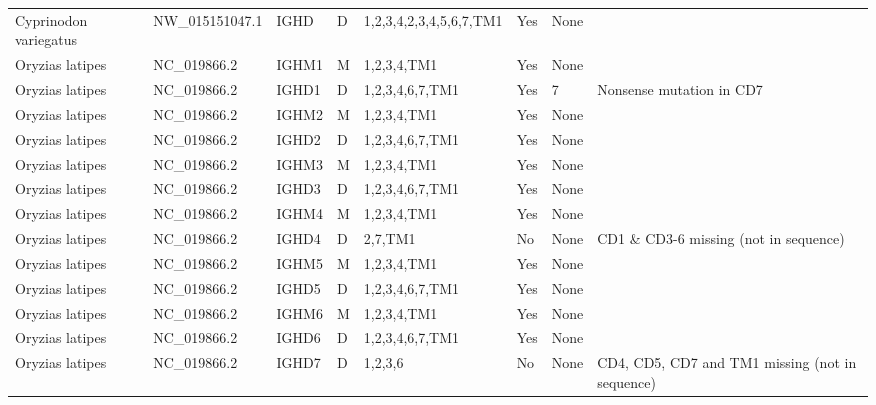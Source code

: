 \begin{tabular}{llllllll}
  Cyprinodon variegatus & NW\_015151047.1 & IGHD & D & 1,2,3,4,2,3,4,5,6,7,TM1 & Yes & None &  \\ 
  Oryzias latipes & NC\_019866.2 & IGHM1 & M & 1,2,3,4,TM1 & Yes & None &  \\ 
  Oryzias latipes & NC\_019866.2 & IGHD1 & D & 1,2,3,4,6,7,TM1 & Yes & 7 & Nonsense mutation in CD7 \\ 
  Oryzias latipes & NC\_019866.2 & IGHM2 & M & 1,2,3,4,TM1 & Yes & None &  \\ 
  Oryzias latipes & NC\_019866.2 & IGHD2 & D & 1,2,3,4,6,7,TM1 & Yes & None &  \\ 
  Oryzias latipes & NC\_019866.2 & IGHM3 & M & 1,2,3,4,TM1 & Yes & None &  \\ 
  Oryzias latipes & NC\_019866.2 & IGHD3 & D & 1,2,3,4,6,7,TM1 & Yes & None &  \\ 
  Oryzias latipes & NC\_019866.2 & IGHM4 & M & 1,2,3,4,TM1 & Yes & None &  \\ 
  Oryzias latipes & NC\_019866.2 & IGHD4 & D & 2,7,TM1 & No & None & CD1 \& CD3-6 missing (not in sequence) \\ 
  Oryzias latipes & NC\_019866.2 & IGHM5 & M & 1,2,3,4,TM1 & Yes & None &  \\ 
  Oryzias latipes & NC\_019866.2 & IGHD5 & D & 1,2,3,4,6,7,TM1 & Yes & None &  \\ 
  Oryzias latipes & NC\_019866.2 & IGHM6 & M & 1,2,3,4,TM1 & Yes & None &  \\ 
  Oryzias latipes & NC\_019866.2 & IGHD6 & D & 1,2,3,4,6,7,TM1 & Yes & None &  \\ 
  Oryzias latipes & NC\_019866.2 & IGHD7 & D & 1,2,3,6 & No & None & CD4, CD5, CD7 and TM1 missing (not in sequence) \\ 
   \bottomrule \end{tabular}
